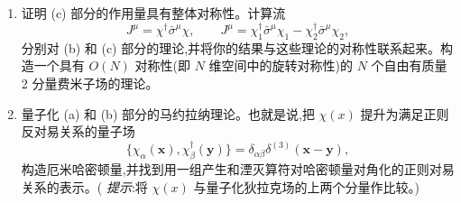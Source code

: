 \begin{enumerate}[label=(\alph*)]
\begin{equation}
    \end{equation}
    并回忆 $\psi$ 的下分量按与表示 $(\tfrac{1}{2}, 0)$ 的复共轭经幺正变换等价的方式变换。这样,我们可以用两个 2 分量旋量改写 4 分量狄拉克场:
    \begin{equation}
      \psi_L(x) = \chi_1(x),\qquad
      \psi_R(x) = i\sigma^2\chi_2^{*}(x) .
    \end{equation}
    用 $\chi_1$ 和 $\chi_2$ 改写狄拉克拉格朗日量,并注意质量项的形式。
  \item 证明 (c) 部分的作用量具有整体对称性。计算流
    \begin{equation}
      J^\mu = \chi^{\dagger}\bar{\sigma}^\mu\chi,\qquad
      J^\mu = \chi_1^{\dagger}\bar{\sigma}^\mu\chi_1
        - \chi_2^{\dagger}\bar{\sigma}^\mu\chi_2,
    \end{equation}
    分别对 (b) 和 (c) 部分的理论,并将你的结果与这些理论的对称性联系起来。构造一个具有 $O(N)$ 对称性(即 $N$ 维空间中的旋转对称性)的 $N$ 个自由有质量 2 分量费米子场的理论。
  \item 量子化 (a) 和 (b) 部分的马约拉纳理论。也就是说,把 $\chi(x)$ 提升为满足正则反对易关系的量子场
    \begin{equation}
      \{\chi_\alpha(\mathbf{x}), \chi_\beta^{\dagger}(\mathbf{y})\}
        = \delta_{\alpha\beta}\delta^{(3)}(\mathbf{x}-\mathbf{y}),
    \end{equation}
    构造厄米哈密顿量,并找到用一组产生和湮灭算符对哈密顿量对角化的正则对易关系的表示。( \emph{提示}:将 $\chi(x)$ 与量子化狄拉克场的上两个分量作比较。)
\end{enumerate}

